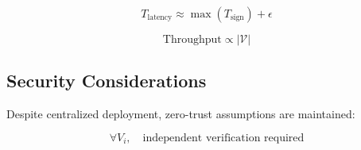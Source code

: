 \begin{equation}
T_{\text{latency}} \approx \max(T_{\text{sign}}) + \epsilon
\end{equation}

\begin{equation}
\text{Throughput} \propto |\mathcal{V}|
\end{equation}

\subsection{Security Considerations}

Despite centralized deployment, zero-trust assumptions are maintained:

\begin{equation}
\forall V_i, \quad \text{independent verification required}
\end{equation}

